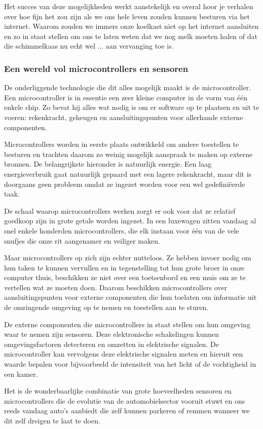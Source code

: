 \documentclass[DIV=calc,paper=a4,fontsize=11pt,twocolumn,draft]{scrartcl}
\newcommand{\heading}[1]{
\subsubsection*{#1}
\vspace{-2mm}
}
\begin{document}
Het succes van deze mogelijkheden werkt aanstekelijk en overal hoor je verhalen
over hoe fijn het zou zijn als we ons hele leven zouden kunnen besturen via het
internet. Waarom zouden we immers onze koelkast niet op het internet aansluiten
en zo in staat stellen om ons te laten weten dat we nog melk moeten halen of
dat die schimmelkaas nu echt wel ... aan vervanging toe is.

\heading{Een wereld vol microcontrollers en sensoren}

De onderliggende technologie die dit alles mogelijk maakt is de
microcontroller. Een microcontroller is in essentie een zeer kleine computer in
de vorm van \'e\'en enkele chip. Zo bevat hij alles wat nodig is om er software
op te plaatsen en uit te voeren: rekenkracht, geheugen en aansluitingspunten
voor allerhande externe componenten.

Microcontrollers worden in eerste plaats ontwikkeld om andere toestellen te
besturen en trachten daarom zo weinig mogelijk aanspraak te maken op externe
bronnen. De belangrijkste hieronder is natuurlijk energie. Een laag
energieverbruik gaat natuurlijk gepaard met een lagere rekenkracht, maar dit is
doorgaans geen probleem omdat ze ingezet worden voor een wel gedefini\"eerde
taak.

De schaal waarop microcontrollers werken zorgt er ook voor dat ze relatief
goedkoop zijn in grote getale worden ingezet. In een luxewagen zitten vandaag
al snel enkele honderden microcontrollers, die elk instaan voor \'e\'en van de
vele snufjes die onze rit aangenamer en veiliger maken.

Maar microcontrollers op zich zijn echter nutteloos. Ze hebben invoer nodig om
hun taken te kunnen vervullen en in tegenstelling tot hun grote broer in onze
computer thuis, beschikken ze niet over een toetsenbord en een muis om ze te
vertellen wat ze moeten doen. Daarom beschikken microcontrollers over
aansluitingspunten voor externe componenten die hun toelaten om informatie uit
de omringende omgeving op te nemen en toestellen aan te sturen.

De externe componenten die microcontrollers in staat stellen om hun omgeving
waar te nemen zijn sensoren. Deze elektronische schakelingen kunnen
omgevingsfactoren detecteren en omzetten in elektrische signalen. De
microcontroller kan vervolgens deze elektrische signalen meten en hieruit een
waarde bepalen voor bijvoorbeeld de intensiteit van het licht of de vochtigheid
in een kamer.

Het is de wonderbaarlijke combinatie van grote hoeveelheden sensoren en
microcontrollers die de evolutie van de automobielsector vooruit stuwt en ons
reeds vandaag auto's aanbiedt die zelf kunnen parkeren of remmen wanneer we dit
zelf dreigen te laat te doen.
\end{document}
